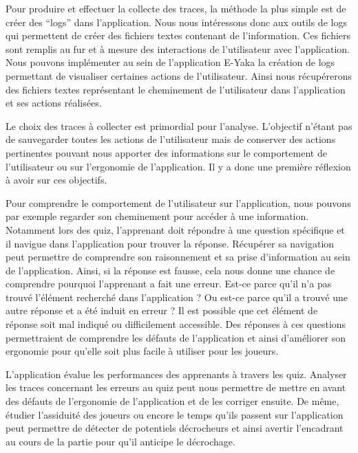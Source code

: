             Pour produire et effectuer la collecte des traces, la méthode la plus simple est de créer des \enquote{logs} dans l’application. Nous nous intéressons donc aux outils de logs qui permettent de créer des fichiers textes contenant de l’information. Ces fichiers sont remplis au fur et à mesure des interactions de l’utilisateur avec l’application. Nous pouvons implémenter au sein de l’application E-Yaka la création de logs permettant de visualiser certaines actions de l’utilisateur. Ainsi nous récupérerons des fichiers textes représentant le cheminement de l’utilisateur dans l’application et ses actions réalisées.
            
            Le choix des traces à collecter est primordial pour l’analyse. L’objectif n’étant pas de sauvegarder toutes les actions de l’utilisateur mais de conserver des actions pertinentes pouvant nous apporter des informations sur le comportement de l’utilisateur ou sur l’ergonomie de l’application. Il y a donc une première réflexion à avoir sur ces objectifs.
            
            Pour comprendre le comportement de l’utilisateur sur l’application, nous pouvons par exemple regarder son cheminement pour accéder à une information. Notamment lors des quiz, l’apprenant doit répondre à une question spécifique et il navigue dans l’application pour trouver la réponse. Récupérer sa navigation peut permettre de comprendre son raisonnement et sa prise d’information au sein de l’application. Ainsi, si la réponse est fausse, cela nous donne une chance de comprendre pourquoi l’apprenant a fait une erreur. Est-ce parce qu’il n’a pas trouvé l’élément recherché dans l’application ? Ou est-ce parce qu’il a trouvé une autre réponse et a été induit en erreur ? Il est possible que cet élément de réponse soit mal indiqué ou difficilement accessible. Des réponses à ces questions permettraient de comprendre les défauts de l’application et ainsi d’améliorer son ergonomie pour qu’elle soit plus facile à utiliser pour les joueurs.
            
            L’application évalue les performances des apprenants à travers les quiz. Analyser les traces concernant les erreurs au quiz peut nous permettre de mettre en avant des défauts de l’ergonomie de l’application et de les corriger ensuite. De même, étudier l’assiduité des joueurs ou encore le temps qu’ils passent sur l’application peut permettre de détecter de potentiels décrocheurs et ainsi avertir l’encadrant au cours de la partie pour qu’il anticipe le décrochage.
        
